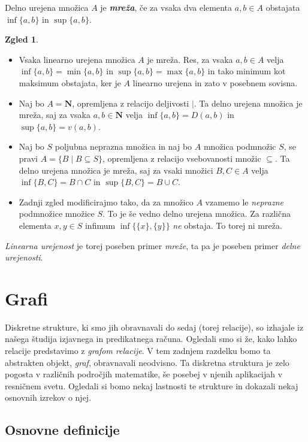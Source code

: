 \documentclass[11pt]{book}
\def\NN{\mathbf{N}}
\def\definicija{\color{rdeca}\bf\em}
\theoremstyle{definition}
\theoremstyle{zgled}
\newtheorem*{zgled}{Zgled}
\theoremstyle{odprtproblem}
\theoremstyle{domacanaloga}
\theoremstyle{izrek}
\begin{document}
Delno urejena množica $A$ je {\definicija mreža}, če za vsaka dva elementa $a,b \in A$ obstajata $\inf \{ a, b \}$ in $\sup \{ a, b \}$.

\begin{zgled} \leavevmode
    \begin{itemize}
        \item Vsaka linearno urejena množica $A$ je mreža. Res, za vsaka $a,b \in A$ velja $\inf \{ a, b \} = \min \{ a,b \}$ in $\sup \{ a, b \} = \max \{ a, b \}$ in tako minimum kot maksimum obstajata, ker je $A$ linearno urejena in zato v posebnem sovisna.
        \item Naj bo $A = \NN$, opremljena z relacijo deljivosti $|$. Ta delno urejena množica je mreža, saj za vsaka $a, b \in \NN$ velja $\inf \{ a,b \} = D(a,b)$ in $\sup \{ a, b \} = v(a,b)$.
        \item Naj bo $S$ poljubna neprazna množica in naj bo $A$ množica podmnožic $S$, se pravi $A = \{ B \mid B \subseteq S \}$, opremljena z relacijo vsebovanosti množic $\subseteq$. Ta delno urejena množica je mreža, saj za vsaki množici $B, C \in A$ velja $\inf \{ B, C \} = B \cap C$ in $\sup \{ B, C \} = B \cup C$.
        \item Zadnji zgled modificirajmo tako, da za množico $A$ vzamemo le \emph{neprazne} podmnožice množice $S$. To je še vedno delno urejena množica. Za različna elementa $x,y \in S$ infimum $\inf \{ \{ x \}, \{ y \} \}$ \emph{ne} obstaja. To torej ni mreža.
    \end{itemize}
\end{zgled}

\emph{Linearna urejenost} je torej poseben primer \emph{mreže}, ta pa je poseben primer \emph{delne urejenosti}.

\chapter{Grafi}

Diskretne strukture, ki smo jih obravnavali do sedaj (torej relacije), so izhajale iz našega študija izjavnega in predikatnega računa. Ogledali smo si že, kako lahko relacije predstavimo z  \emph{grafom relacije}. V tem zadnjem razdelku bomo ta abstrakten objekt, \emph{graf}, obravnavali neodvisno. Ta diskretna struktura je zelo pogosta v različnih področjih matematike, še posebej v njenih aplikacijah v resničnem svetu. Ogledali si bomo nekaj lastnosti te strukture in dokazali nekaj osnovnih izrekov o njej. 

\section{Osnovne definicije}
\end{document}
